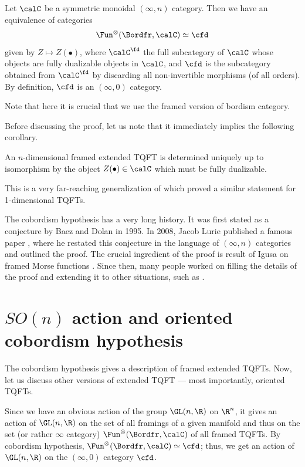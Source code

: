 \begin{theorem}\label{t:cob-hyp}
Let $\calC$ be a symmetric monoidal $(\infty, n)$ category. Then we have an
equivalence of categories
$$
  \Fun^{\otimes}(\Bordfr, \calC)\simeq \cfd
$$
given by $Z\mapsto Z(\bullet)$, where
$\calC^\fd$ the full subcategory of $\calC$ whose objects are fully dualizable
objects  in $\calC$, and   $\cfd$ is the subcategory obtained from
$\calC^\fd$ by discarding all non-invertible morphisms \textup{(}of all orders\textup{)}. By
definition, $\cfd$ is an $(\infty,0)$ category.
\end{theorem}

Note that here it is crucial that we use the framed version of bordism category.

Before discussing the proof, let us note that it immediately implies the
following corollary.
\begin{corollary}
  An $n$-dimensional framed extended  TQFT is  determined uniquely up to
  isomorphism by the object $Z(\bullet)\in \calC$ which must be fully
  dualizable.
\end{corollary}
This is a very far-reaching generalization of  which proved a
similar statement for 1-dimensional TQFTs.

The cobordism hypothesis has a very long history. It was first stated as a
conjecture by Baez and Dolan \cite{baez-dolan-tqft} in 1995. In 2008, Jacob
Lurie published a famous paper \cite{lurie-cobordism}, where he  restated this
conjecture in  the language of $(\infty, n)$ categories and outlined the proof.
The crucial ingredient of the proof is result of Igusa on framed Morse functions
\cite{igusa}. Since then, many people worked on filling the details of the
proof and extending it to other situations, such as \cite{ayala-francis2017}.


\section{$SO(n)$ action and oriented cobordism hypothesis}
\label{s:oriented-cobordism-hypothesis}
The cobordism hypothesis gives a description of framed extended TQFTs. Now, let
us discuss other versions of extended TQFT  --- most importantly, oriented
TQFTs.

Since we have an obvious action of the group $\GL(n,\R)$ on $\R^n$, it gives an
action of $\GL(n,\R)$ on the set of all framings of a given manifold and thus on
the set (or rather $\infty$ category)  $\Fun^{\otimes}(\Bordfr, \calC)$ of all
framed TQFTs. By cobordism hypothesis,   $\Fun^{\otimes}(\Bordfr, \calC)\simeq
\cfd$; thus, we get an action of $\GL(n,\R)$ on the $(\infty, 0)$ category
$\cfd$.

